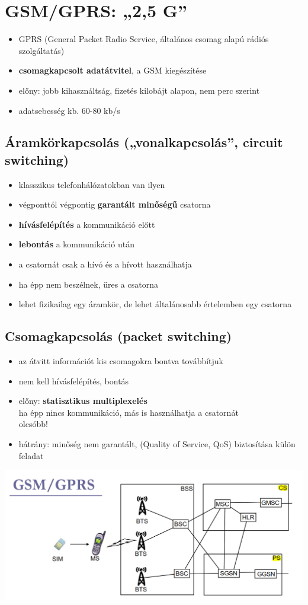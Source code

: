 \documentclass[10pt,a4paper]{article}
\begin{document}
\section{GSM/GPRS: „2,5 G”}
\begin{itemize}
	\item  GPRS (General Packet Radio Service, általános
	csomag alapú rádiós szolgáltatás)
	\item \textbf{csomagkapcsolt adatátvitel}, a GSM kiegészítése
	\item előny: jobb kihasználtság, fizetés kilobájt alapon, nem perc szerint
	\item adatsebesség kb. 60-80 kb/s
\end{itemize}
\subsection{Áramkörkapcsolás („vonalkapcsolás”, circuit switching)}
\begin{itemize}
	\item klasszikus telefonhálózatokban van ilyen
	\item végponttól végpontig \textbf{garantált minőségű} csatorna
	\item \textbf{hívásfelépítés} a kommunikáció előtt
	\item \textbf{lebontás} a kommunikáció után
	\item a csatornát csak a hívó és a hívott használhatja
	\item ha épp nem beszélnek, üres a csatorna
	\item lehet fizikailag egy áramkör, de lehet általánosabb értelemben
	egy csatorna
\end{itemize}
\subsection{Csomagkapcsolás (packet switching)}
\begin{itemize}
	\item az átvitt információt kis csomagokra bontva továbbítjuk
	\item nem kell hívásfelépítés, bontás
	\item előny: \textbf{statisztikus multiplexelés}
	\\ ha épp nincs kommunikáció, más is használhatja a csatornát
	\\ olcsóbb!
	\item hátrány: minőség nem garantált, (Quality of Service, QoS) biztosítása külön feladat
\end{itemize}
\begin{center}
	\includegraphics[width=0.5\linewidth]{src/gsmgprs}
\end{center}
\end{document}
